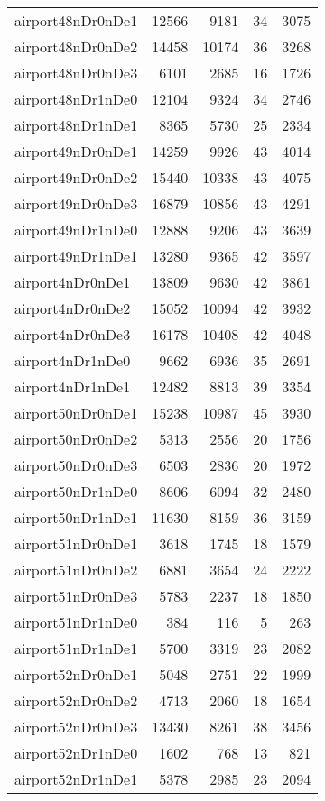 \begin{longtable}{lrrrr}
airport48nDr0nDe1 & 12566 & 9181 & 34 & 3075 \\
airport48nDr0nDe2 & 14458 & 10174 & 36 & 3268 \\
airport48nDr0nDe3 & 6101 & 2685 & 16 & 1726 \\
airport48nDr1nDe0 & 12104 & 9324 & 34 & 2746 \\
airport48nDr1nDe1 & 8365 & 5730 & 25 & 2334 \\
airport49nDr0nDe1 & 14259 & 9926 & 43 & 4014 \\
airport49nDr0nDe2 & 15440 & 10338 & 43 & 4075 \\
airport49nDr0nDe3 & 16879 & 10856 & 43 & 4291 \\
airport49nDr1nDe0 & 12888 & 9206 & 43 & 3639 \\
airport49nDr1nDe1 & 13280 & 9365 & 42 & 3597 \\
airport4nDr0nDe1 & 13809 & 9630 & 42 & 3861 \\
airport4nDr0nDe2 & 15052 & 10094 & 42 & 3932 \\
airport4nDr0nDe3 & 16178 & 10408 & 42 & 4048 \\
airport4nDr1nDe0 & 9662 & 6936 & 35 & 2691 \\
airport4nDr1nDe1 & 12482 & 8813 & 39 & 3354 \\
airport50nDr0nDe1 & 15238 & 10987 & 45 & 3930 \\
airport50nDr0nDe2 & 5313 & 2556 & 20 & 1756 \\
airport50nDr0nDe3 & 6503 & 2836 & 20 & 1972 \\
airport50nDr1nDe0 & 8606 & 6094 & 32 & 2480 \\
airport50nDr1nDe1 & 11630 & 8159 & 36 & 3159 \\
airport51nDr0nDe1 & 3618 & 1745 & 18 & 1579 \\
airport51nDr0nDe2 & 6881 & 3654 & 24 & 2222 \\
airport51nDr0nDe3 & 5783 & 2237 & 18 & 1850 \\
airport51nDr1nDe0 & 384 & 116 & 5 & 263 \\
airport51nDr1nDe1 & 5700 & 3319 & 23 & 2082 \\
airport52nDr0nDe1 & 5048 & 2751 & 22 & 1999 \\
airport52nDr0nDe2 & 4713 & 2060 & 18 & 1654 \\
airport52nDr0nDe3 & 13430 & 8261 & 38 & 3456 \\
airport52nDr1nDe0 & 1602 & 768 & 13 & 821 \\
airport52nDr1nDe1 & 5378 & 2985 & 23 & 2094 \\

\end{longtable}
